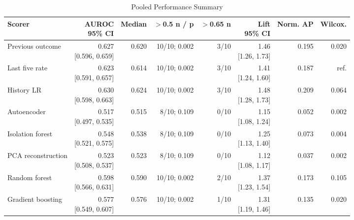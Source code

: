 \begin{table}[htbp]
\centering
\scriptsize\setlength{\tabcolsep}{1.5pt}
\caption{Pooled Performance Summary}
\label{tab:pooled}
\begin{tabular}{lrrrrrrr}
\toprule
Scorer & \shortstack{AUROC\\95\% CI} & Median & \shortstack{$>$0.5\\n / p} & \shortstack{$>$0.65\\n} & \shortstack{Lift\\95\% CI} & Norm. AP & Wilcox. \\
\midrule
Previous outcome & \shortstack{0.627\\{[0.596, 0.659]}} & 0.620 & 10/10; 0.002 & 3/10 & \shortstack{1.46\\{[1.26, 1.73]}} & 0.195 & 0.020 \\
Last five rate & \shortstack{0.623\\{[0.591, 0.657]}} & 0.614 & 10/10; 0.002 & 3/10 & \shortstack{1.41\\{[1.24, 1.60]}} & 0.187 & ref. \\
History LR & \shortstack{0.630\\{[0.598, 0.663]}} & 0.624 & 10/10; 0.002 & 3/10 & \shortstack{1.48\\{[1.28, 1.73]}} & 0.209 & 0.064 \\
Autoencoder & \shortstack{0.517\\{[0.497, 0.535]}} & 0.515 & 8/10; 0.109 & 0/10 & \shortstack{1.15\\{[1.08, 1.24]}} & 0.052 & 0.002 \\
Isolation forest & \shortstack{0.548\\{[0.521, 0.575]}} & 0.538 & 8/10; 0.109 & 0/10 & \shortstack{1.25\\{[1.13, 1.40]}} & 0.073 & 0.004 \\
PCA reconstruction & \shortstack{0.523\\{[0.508, 0.537]}} & 0.523 & 8/10; 0.109 & 0/10 & \shortstack{1.12\\{[1.08, 1.17]}} & 0.037 & 0.002 \\
Random forest & \shortstack{0.598\\{[0.566, 0.631]}} & 0.590 & 10/10; 0.002 & 2/10 & \shortstack{1.37\\{[1.23, 1.54]}} & 0.173 & 0.105 \\
Gradient boosting & \shortstack{0.577\\{[0.549, 0.607]}} & 0.576 & 10/10; 0.002 & 1/10 & \shortstack{1.31\\{[1.19, 1.46]}} & 0.135 & 0.020 \\
\bottomrule
\end{tabular}
\end{table}
